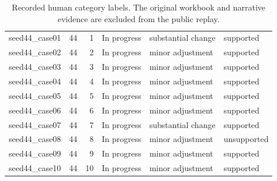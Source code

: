 \begin{table}[htbp!]
\begin{tabular}{lrrlll}
seed44\_case01 & 44 & 1 & In progress & substantial change & supported \\
seed44\_case02 & 44 & 2 & In progress & minor adjustment & supported \\
seed44\_case03 & 44 & 3 & In progress & minor adjustment & supported \\
seed44\_case04 & 44 & 4 & In progress & minor adjustment & supported \\
seed44\_case05 & 44 & 5 & In progress & minor adjustment & supported \\
seed44\_case06 & 44 & 6 & In progress & minor adjustment & supported \\
seed44\_case07 & 44 & 7 & In progress & substantial change & supported \\
seed44\_case08 & 44 & 8 & In progress & minor adjustment & unsupported \\
seed44\_case09 & 44 & 9 & In progress & minor adjustment & supported \\
seed44\_case10 & 44 & 10 & In progress & minor adjustment & supported \\
\hline
\end{tabular}
\caption{Recorded human category labels. The original workbook and narrative evidence are excluded from the public replay.}
\label{chap:results:tab:rq3_profile_review_saved_assessments}
\end{table}
